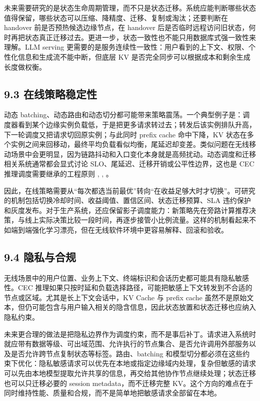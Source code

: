 未来需要研究的是状态生命周期管理，而不只是状态迁移。系统应能判断哪些状态值得保留，哪些状态可以压缩、降精度、迁移、复制或淘汰；还要判断在 handover 前是否预热候选边缘节点，在 handover 后是否临时远程访问旧状态，何时再把状态真正迁移过去。更进一步，状态一致性也不能只用数据库式强一致性来理解。LLM serving 更需要的是服务连续性一致性：用户看到的上下文、权限、个性化信息和生成流不能中断，但底层 KV 是否完全同步可以根据成本和剩余生成长度做权衡。


\subsection*{9.3 在线策略稳定性}

动态 batching、动态路由和动态切分都可能带来策略震荡。一个典型例子是：调度器看到某个边缘实例负载低，于是把更多请求转过去；转发后该实例排队升高，下一轮调度又把请求切回原实例；与此同时 prefix cache 命中下降，KV 状态在多个实例之间来回移动，最终平均负载看似均衡，尾延迟却变差。类似问题在无线移动场景中会更明显，因为链路抖动和入口变化本身就是高频扰动。动态调度和迁移相关系统通常都会显式讨论 SLO、尾延迟、迁移开销或公平性边界，这也是 CEC 推理调度需要继承的工程原则 \cite{zhong2024distserve}, \cite{sun2024llumnix}, \cite{sheng2024fairness}。

因此，在线策略需要从“每次都选当前最优”转向“在收益足够大时才切换”。可研究的机制包括切换冷却时间、收益阈值、置信区间、状态迁移预算、SLA 违约保护和灰度发布。对于生产系统，还应保留影子调度能力：新策略先在旁路计算推荐决策，与线上实际决策比较一段时间，再逐步接管小比例流量。这样的机制看起来不如端到端强化学习漂亮，但在无线软件环境中更容易解释、回滚和验收。


\subsection*{9.4 隐私与合规}

无线场景中的用户位置、业务上下文、终端标识和会话历史都可能具有隐私敏感性。CEC 推理如果只按时延和负载选择路径，可能把敏感上下文转发到不合适的节点或区域。尤其是长上下文会话中，KV Cache 与 prefix cache 虽然不是原始文本，但仍可能包含与用户输入相关的隐含信息，因此状态放置和状态迁移也应纳入隐私约束。

未来更合理的做法是把隐私边界作为调度约束，而不是事后补丁。请求进入系统时就应带有数据等级、可出域范围、允许执行的节点集合、是否允许调用外部服务以及是否允许跨节点复制状态等标签。路由、batching 和模型切分都必须在这些约束下优化：隐私敏感请求可以优先在本地或指定边缘域内处理，复杂但敏感的请求可以先由本地模型提取允许共享的信息，再交给其他协作节点继续处理；状态迁移也可以只迁移必要的 session metadata，而不迁移完整 KV。这个方向的难点在于同时维持性能、质量和合规，而不是简单地把敏感请求全部留在本地。



